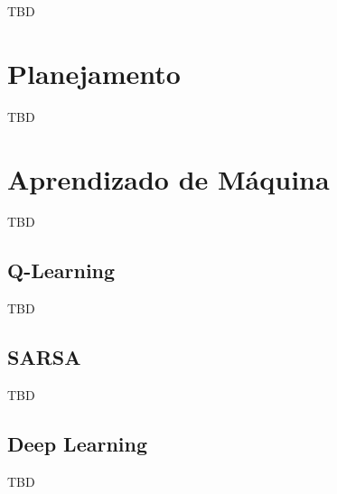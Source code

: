 TBD

\section{Planejamento}

TBD

\section{Aprendizado de Máquina}

TBD

\subsection{Q-Learning}

TBD

\subsection{SARSA}

TBD

\subsection{Deep Learning}

TBD
